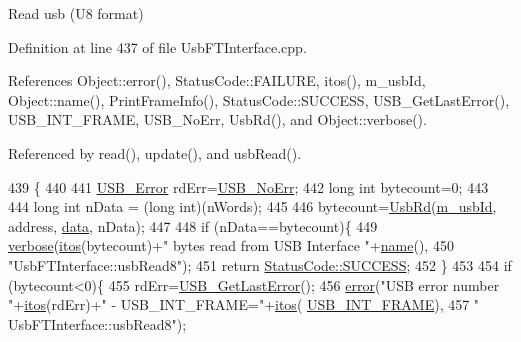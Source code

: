 Read usb (U8 format) 

Definition at line 437 of file Usb\+F\+T\+Interface.\+cpp.



References Object\+::error(), Status\+Code\+::\+F\+A\+I\+L\+U\+RE, itos(), m\+\_\+usb\+Id, Object\+::name(), Print\+Frame\+Info(), Status\+Code\+::\+S\+U\+C\+C\+E\+SS, U\+S\+B\+\_\+\+Get\+Last\+Error(), U\+S\+B\+\_\+\+I\+N\+T\+\_\+\+F\+R\+A\+ME, U\+S\+B\+\_\+\+No\+Err, Usb\+Rd(), and Object\+::verbose().



Referenced by read(), update(), and usb\+Read().


\begin{DoxyCode}
439                                                              \{
440   
441   \hyperlink{LALUsbML_8h_aa7e5a2302774d5aa1d48a2a1cfc46e86}{USB\_Error} rdErr=\hyperlink{LALUsbML_8h_ab44759ae95dd86cbc2855adf525c43cd}{USB\_NoErr};
442   \textcolor{keywordtype}{long} \textcolor{keywordtype}{int} bytecount=0;
443 
444   \textcolor{keywordtype}{long} \textcolor{keywordtype}{int} nData = (\textcolor{keywordtype}{long} int)(nWords);
445 
446   bytecount=\hyperlink{LALUsbML_8h_a613b00e83691d644c8d1cf05c499392b}{UsbRd}(\hyperlink{classUsbFTInterface_a91df5c0547e8be460bc087e27afe05aa}{m\_usbId}, address, \hyperlink{namespaceshell_a5ea2525995cedc3efd69ea8a7f034d1e}{data}, nData);
447 
448   \textcolor{keywordflow}{if} (nData==bytecount)\{
449     \hyperlink{classObject_a83d2db2df682907ea1115ad721c1c4a1}{verbose}(\hyperlink{Tools_8h_af330027dbdafb9a30768b3613c553e60}{itos}(bytecount)+\textcolor{stringliteral}{" bytes read from USB Interface "}+\hyperlink{classObject_a300f4c05dd468c7bb8b3c968868443c1}{name}(),
450             \textcolor{stringliteral}{"UsbFTInterface::usbRead8"});
451     \textcolor{keywordflow}{return} \hyperlink{classStatusCode_a6f565cbeadc76d14c72f047e5e85eb4badd0da38d3ba0d922efd1f4619bc37ad8}{StatusCode::SUCCESS};
452   \}
453 
454   \textcolor{keywordflow}{if} (bytecount<0)\{
455     rdErr=\hyperlink{LALUsbML_8h_a1662b77c9968848acf173f6f9c765ddd}{USB\_GetLastError}();
456     \hyperlink{classObject_a204a95f57818c0f811933917a30eff45}{error}(\textcolor{stringliteral}{"USB error number "}+\hyperlink{Tools_8h_af330027dbdafb9a30768b3613c553e60}{itos}(rdErr)+\textcolor{stringliteral}{" - USB\_INT\_FRAME="}+\hyperlink{Tools_8h_af330027dbdafb9a30768b3613c553e60}{itos}(
      \hyperlink{LALUsbML_8h_a68260f9cf3649507d12904cfa1592c11afd1c409187b1dfd3d66887a5e07e7ed3}{USB\_INT\_FRAME}),
457             \textcolor{stringliteral}{" UsbFTInterface::usbRead8"});

\end{DoxyCode}
